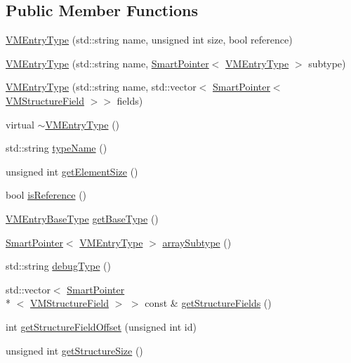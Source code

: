 \subsection*{Public Member Functions}
\begin{DoxyCompactItemize}
\item 
\hyperlink{class_v_m_1_1_v_m_entry_type_af1c10a8b775cc7c0ab460662e98e1f5e}{V\-M\-Entry\-Type} (std\-::string name, unsigned int size, bool reference)
\item 
\hyperlink{class_v_m_1_1_v_m_entry_type_ab98d036a7d48fdb248ee6fad323b4b73}{V\-M\-Entry\-Type} (std\-::string name, \hyperlink{_smart_pointer_8hpp_afdd8d4ba81c3fcbdeacf1dafba2accfb}{Smart\-Pointer}$<$ \hyperlink{class_v_m_1_1_v_m_entry_type}{V\-M\-Entry\-Type} $>$ subtype)
\item 
\hyperlink{class_v_m_1_1_v_m_entry_type_a78eced662845dcab02a51fb0380f0f07}{V\-M\-Entry\-Type} (std\-::string name, std\-::vector$<$ \hyperlink{_smart_pointer_8hpp_afdd8d4ba81c3fcbdeacf1dafba2accfb}{Smart\-Pointer}$<$ \hyperlink{class_v_m_1_1_v_m_structure_field}{V\-M\-Structure\-Field} $>$$>$ fields)
\item 
virtual \hyperlink{class_v_m_1_1_v_m_entry_type_a9a379982b020e46b00344ba3dc88e244}{$\sim$\-V\-M\-Entry\-Type} ()
\item 
std\-::string \hyperlink{class_v_m_1_1_v_m_entry_type_ac4220642624d606264083b1ef60cca4f}{type\-Name} ()
\item 
unsigned int \hyperlink{class_v_m_1_1_v_m_entry_type_a98c2ca6402f1ad3068ed46f6138e905c}{get\-Element\-Size} ()
\item 
bool \hyperlink{class_v_m_1_1_v_m_entry_type_a284a434c44410a8474ee988502dd9bb0}{is\-Reference} ()
\item 
\hyperlink{namespace_v_m_a827f5d8d480f2262d073c82260b1457f}{V\-M\-Entry\-Base\-Type} \hyperlink{class_v_m_1_1_v_m_entry_type_a4ddbfa9120423d037e0577028e7d7eeb}{get\-Base\-Type} ()
\item 
\hyperlink{_smart_pointer_8hpp_afdd8d4ba81c3fcbdeacf1dafba2accfb}{Smart\-Pointer}$<$ \hyperlink{class_v_m_1_1_v_m_entry_type}{V\-M\-Entry\-Type} $>$ \hyperlink{class_v_m_1_1_v_m_entry_type_aba116868d3a2af6704c86c16f67f546e}{array\-Subtype} ()
\item 
std\-::string \hyperlink{class_v_m_1_1_v_m_entry_type_a239a745a61ac8051bb7ac72210bfee42}{debug\-Type} ()
\item 
std\-::vector$<$ \hyperlink{_smart_pointer_8hpp_afdd8d4ba81c3fcbdeacf1dafba2accfb}{Smart\-Pointer}\\*
$<$ \hyperlink{class_v_m_1_1_v_m_structure_field}{V\-M\-Structure\-Field} $>$ $>$ const \& \hyperlink{class_v_m_1_1_v_m_entry_type_a278f76fb711fbca0eafddad6a6342ece}{get\-Structure\-Fields} ()
\item 
int \hyperlink{class_v_m_1_1_v_m_entry_type_a20b457c5cdbfee3839b2cdf0213cba96}{get\-Structure\-Field\-Offset} (unsigned int id)
\item 
unsigned int \hyperlink{class_v_m_1_1_v_m_entry_type_affa37faa49a60b7b3f913bf1cc3f5730}{get\-Structure\-Size} ()
\end{DoxyCompactItemize}


